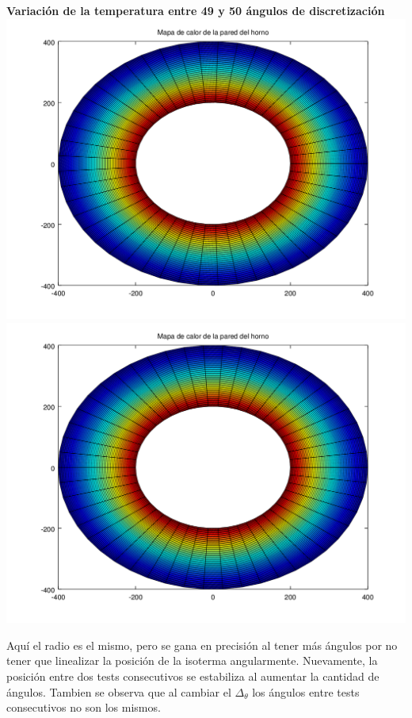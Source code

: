 \begin{enumerate}
		\textbf{Variación de la temperatura entre 49 y 50 ángulos de discretización}\\
	  	\includegraphics[scale=0.35]{experimentos1a_1b/evolucion_posicion_isoterma_temperatura/variacion_angulos_radio_fijo_se_suaviza_isoterma/test10_050_radios_049_angulos_inst_001_heatmap.png}
		\includegraphics[scale=0.35]{experimentos1a_1b/evolucion_posicion_isoterma_temperatura/variacion_angulos_radio_fijo_se_suaviza_isoterma/test10_050_radios_050_angulos_inst_001_heatmap.png}

\vspace{0.5cm}

Aquí el radio es el mismo, pero se gana en precisión al tener más ángulos por no tener que linealizar la posición de la isoterma angularmente. Nuevamente, la posición entre dos tests consecutivos se estabiliza al aumentar la cantidad de ángulos. Tambien se observa que al cambiar el $\Delta_\theta$ los ángulos entre tests consecutivos no son los mismos.


\end{enumerate}

